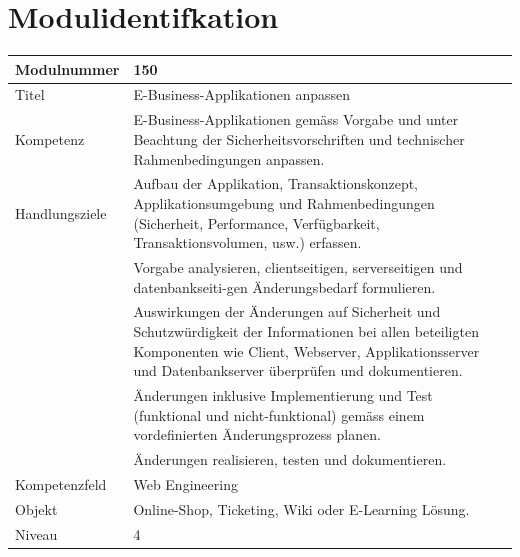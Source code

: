 \mode*

\setmonofont{Verdana}

\newtheorem{beispiel}{Beispiel}[section]
\newtheorem*{bemerkung}{Bemerkung}

\section{Modulidentifkation}



\begin{center}
    \begin{tabular}[h]{|p{4cm}|p{12.5cm}|}
        \hline
        Modulnummer & 150 \\ \hline
        Titel & E-Business-Applikationen anpassen \\ \hline
        Kompetenz & E-Business-Applikationen gemäss Vorgabe und unter Beachtung der
        Sicherheitsvorschriften und technischer Rahmenbedingungen anpassen. \\ \hline
        \multirow{1}{*}{Handlungsziele} &
        Aufbau der Applikation, Transaktionskonzept, Applikationsumgebung
        und Rahmenbedingungen (Sicherheit, Performance, Verfügbarkeit, Transaktionsvolumen, usw.) erfassen. \\
        \cellcolor{white}  & Vorgabe analysieren, clientseitigen, serverseitigen und datenbankseiti-gen
        Änderungsbedarf formulieren. \\
        \cellcolor{white}  & Auswirkungen der Änderungen auf Sicherheit und Schutzwürdigkeit der
        Informationen bei allen beteiligten Komponenten wie Client, Webserver, Applikationsserver
        und Datenbankserver überprüfen und dokumentieren. \\
        \cellcolor{white}  & Änderungen inklusive Implementierung und Test (funktional und nicht-funktional)
        gemäss einem vordefinierten Änderungsprozess planen. \\
        \cellcolor{white}  & Änderungen realisieren, testen und dokumentieren. \\ \hline
        Kompetenzfeld & Web Engineering \\ \hline
        Objekt & Online-Shop, Ticketing, Wiki oder E-Learning Lösung. \\ \hline
        Niveau & 4 \\ \hline
    \end{tabular}
\end{center}

